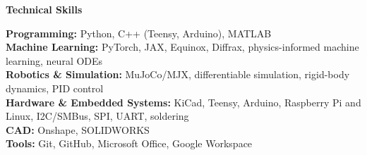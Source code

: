 \begin{center}
    \textbf{Technical Skills}
\end{center}

\textbf{Programming:} Python, C++ (Teensy, Arduino), MATLAB\\
\textbf{Machine Learning:} PyTorch, JAX, Equinox, Diffrax, physics-informed machine learning, neural ODEs\\
\textbf{Robotics \& Simulation:} MuJoCo/MJX, differentiable simulation, rigid-body dynamics, PID control\\
\textbf{Hardware \& Embedded Systems:} KiCad, Teensy, Arduino, Raspberry Pi and Linux, I2C/SMBus, SPI, UART, soldering\\
\textbf{CAD:} Onshape, SOLIDWORKS\\
\textbf{Tools:} Git, GitHub, Microsoft Office, Google Workspace
